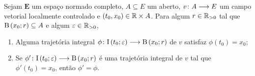 \begin{comment}
\begin{proposition}[Existência e unicidade local de trajetória integral]
\label{prop:existencia.unicidade.local.trajetoria.integral}
Sejam $\bm E$ um espaço normado completo, $A \subseteq E$ um aberto, $\fun{v}{A}{E}$ um campo vetorial localmente controlado e $(t_0,x_0) \in \R \times A$. Para algum intervalo aberto $I \subseteq \R$ tal que $t_0 \in I$,%
	\begin{enumerate}
	\item Alguma trajetória integral $\fun{\phi}{I}{A}$ de $v$ satisfaz $\phi(t_0) = x_0$;
	\item Se $\fun{\phi'}{I}{A}$ é uma trajetória integral de $v$ tal que $\phi'(t_0) = x_0$, então $\phi' = \phi$.
	\end{enumerate}
\end{proposition}
\end{comment}
\begin{proposition}
\label{prop:existencia.unicidade.local.trajetoria.integral}
Sejam $\bm E$ um espaço normado completo, $A \subseteq E$ um aberto, $v\colon \allowbreak A \longrightarrow E$ um campo vetorial localmente controlado e $(t_0,x_0) \in \mathbb{R} \times A$. Para algum $r \in \mathbb{R}_{>0}$ tal que $\mathrm{B}\left(x_0; r\right) \subseteq A$ e algum $\varepsilon \in \mathbb{R}_{>0}$,
	\begin{enumerate}
	\item Alguma trajetória integral $\phi\colon \allowbreak \mathrm{I}\left(t_0; \varepsilon\right) \longrightarrow \mathrm{B}\left(x_0; r\right)$ de $v$ satisfaz $\phi(t_0) = x_0$;
	\item Se $\phi'\colon \allowbreak \mathrm{I}\left(t_0; \varepsilon\right) \longrightarrow \mathrm{B}\left(x_0; r\right)$ é uma trajetória integral de $v$ tal que $\phi'(t_0) = x_0$, então $\phi' = \phi$.
	\end{enumerate}
\end{proposition}
